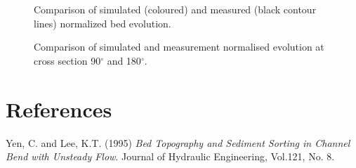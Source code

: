 \begin{figure} [!h]
\centering
{}
 \caption{Comparison of simulated (coloured) and measured (black contour lines) normalized bed evolution.}\label{fig:results1}
\end{figure}

\begin{figure} [!h]
\centering
{}
 \caption{Comparison of simulated and measurement normalised evolution at cross section 90$^{\circ}$ and 180$^{\circ}$.}\label{fig:results2}
\end{figure}



\section{References}
%
Yen, C. and Lee, K.T. (1995) \textit{Bed Topography and Sediment Sorting in Channel Bend
with Unsteady Flow}. Journal of Hydraulic Engineering, Vol.121, No. 8.
